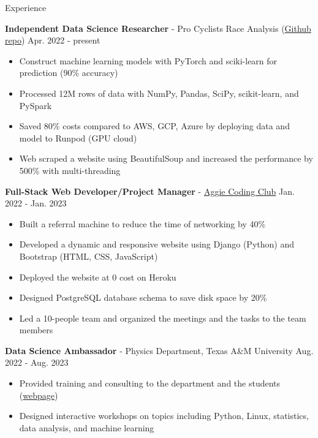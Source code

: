 \documentclass{resume}
\begin{document}
\begin{rSection}{Experience}
    \item \textbf{Independent Data Science Researcher} - {Pro Cyclists Race Analysis} (\href{https://github.com/noctildon/pro_cyclists}{Github repo}) \hfill Apr. 2022 - present
        \begin{itemize}
        \item Construct machine learning models with PyTorch and sciki-learn for prediction ($90\%$ accuracy)
        \item Processed 12M rows of data with NumPy, Pandas, SciPy, scikit-learn, and PySpark
        \item Saved 80\% costs compared to AWS, GCP, Azure by deploying data and model to Runpod (GPU cloud)
        \item Web scraped a website using BeautifulSoup and increased the performance by 500\% with multi-threading
        \end{itemize}


    \item \textbf{Full-Stack Web Developer/Project Manager} - \href{https://aggiecodingclub.com}{Aggie Coding Club} \hfill Jan. 2022 - Jan. 2023
    \begin{itemize}
        \item Built a referral machine to reduce the time of networking by 40\%
        \item Developed a dynamic and responsive website using Django (Python) and Bootstrap (HTML, CSS, JavaScript)
        \item Deployed the website at 0 cost on Heroku
        \item Designed PostgreSQL database schema to save disk space by 20\%
        \item Led a 10-people team and organized the meetings and the tasks to the team members
    \end{itemize}

    \item \textbf{Data Science Ambassador} - Physics Department, Texas A\&M University \hfill Aug. 2022 - Aug. 2023
        \begin{itemize}
        \item Provided training and consulting to the department and the students (\href{https://noctildon.github.io/DS_ambassador/index.html}{webpage})
        \item Designed interactive workshops on topics including Python, Linux, statistics, data analysis, and machine learning
        \end{itemize}
\end{rSection}
\end{document}
